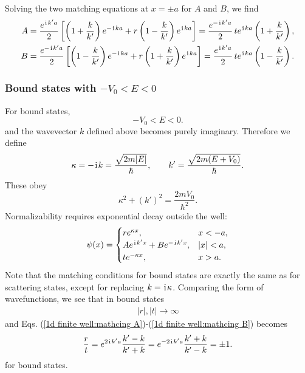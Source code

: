Solving the two matching equations at \(x=\pm a\) for \(A\) and \(B\), we find \begin{align}\label{1d finite well:mathcing A} A &= \frac{e^{\hspace{1pt}\mathrm{i}\hspace{1pt} k'a}}{2} \left[ \left(1+\frac{k}{k'}\right)e^{-\hspace{1pt}\mathrm{i}\hspace{1pt} ka} + r\left(1-\frac{k}{k'}\right)e^{\hspace{1pt}\mathrm{i}\hspace{1pt} ka} \right]= \frac{e^{-\hspace{1pt}\mathrm{i}\hspace{1pt} k'a}}{2}\, t e^{\hspace{1pt}\mathrm{i}\hspace{1pt} ka} \left(1+\frac{k}{k'}\right), \\ B &= \frac{e^{-\hspace{1pt}\mathrm{i}\hspace{1pt} k'a}}{2} \left[ \left(1-\frac{k}{k'}\right)e^{-\hspace{1pt}\mathrm{i}\hspace{1pt} ka} + r\left(1+\frac{k}{k'}\right)e^{\hspace{1pt}\mathrm{i}\hspace{1pt} ka} \right]= \frac{e^{\hspace{1pt}\mathrm{i}\hspace{1pt} k'a}}{2}\, t e^{\hspace{1pt}\mathrm{i}\hspace{1pt} ka} \left(1-\frac{k}{k'}\right). \label{1d finite well:mathcing B}\end{align}


\subsubsection{Bound states with $-V_0<E<0$}
For bound states,
\begin{equation}
 -V_0<E<0.
\end{equation}
and the wavevector $k$ defined above becomes purely imaginary. Therefore we define
\begin{equation}
 \kappa=-\hspace{1pt}\mathrm{i}\hspace{1pt} k=\frac{\sqrt{2m|E|}}{\hbar},
 \qquad
 k'=\frac{\sqrt{2m(E+V_0)}}{\hbar}.
\end{equation}
These obey
\begin{equation}
 \kappa^2+(k')^2=\frac{2mV_0}{\hbar^2}.
\end{equation}
Normalizability requires exponential decay outside the well:
\begin{equation}
 \psi(x)=
 \begin{cases}
 r e^{\kappa x}, & x<-a,\\
 A e^{\hspace{1pt}\mathrm{i}\hspace{1pt} k'x}+B e^{-\hspace{1pt}\mathrm{i}\hspace{1pt} k'x}, & |x|<a,\\
 t e^{-\kappa x}, & x>a.
 \end{cases}
\end{equation}
Note that the matching conditions for bound states are exactly the same as for scattering states, except for replacing $k=\hspace{1pt}\mathrm{i}\hspace{1pt}\kappa$. Comparing the form of wavefunctions, we see that in bound states
\begin{align}
    |r|,|t|\rightarrow\infty
\end{align}
and Eqs. (\ref{1d finite well:mathcing A})-(\ref{1d finite well:mathcing B}) becomes
\begin{equation} 
\frac{r}{t} = e^{2\hspace{1pt}\mathrm{i}\hspace{1pt} k'a}\frac{k'-k}{k'+k} = e^{-2\hspace{1pt}\mathrm{i}\hspace{1pt} k'a}\frac{k'+k}{k'-k} = \pm 1. \end{equation}
for bound states. 


